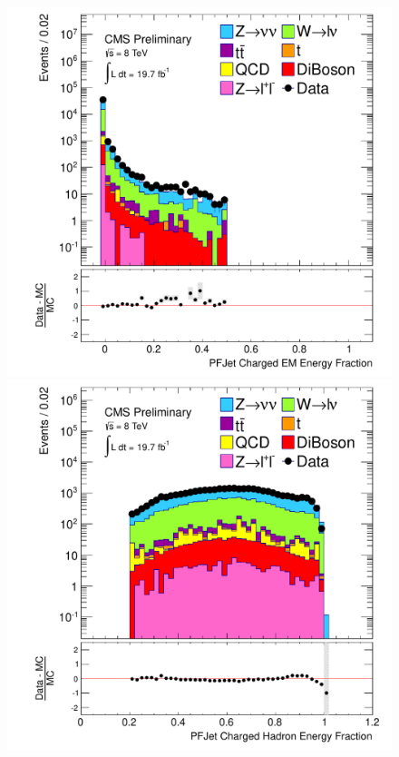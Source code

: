 \begin{figure}[!Hhtb]
  \begin{center}
  \includegraphics[scale=0.31]     {Figures/sus13009/nocut/prelimLabels/cut/PFAK5JetChaEmEngFrac.pdf}
  \includegraphics[scale=0.31]     {Figures/sus13009/nocut/prelimLabels/cut/PFAK5JetChaHadEngFrac.pdf}

\end{center}
\end{figure}
